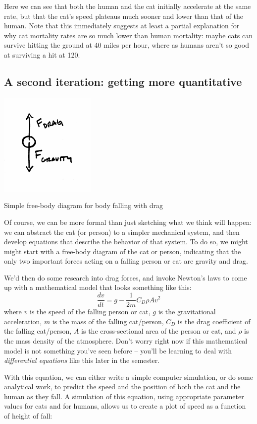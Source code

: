 Here we can see that both the human and the cat initially accelerate at the same rate, but that the cat's speed plateaus much sooner and lower than that of the human.  Note that this immediately suggests at least a partial explanation for why cat mortality rates are so much lower than human mortality:  maybe cats can survive hitting the ground at 40 miles per hour, where as humans aren't so good at surviving a hit at 120.

\subsection{A second iteration: getting more quantitative}
\begin{marginfigure}
\centerline{\includegraphics[height=5cm]{figs/CatFBD}}
\caption{Simple free-body diagram for body falling with drag}
\end{marginfigure}
Of course, we can be more formal than just sketching what we think will happen:  we can abstract the cat (or person) to a simpler mechanical system, and then develop equations that describe the behavior of that system.  To do so, we might might start with a free-body diagram of the cat or person,
indicating that the only two important forces acting on a falling person or cat are gravity and drag.

We'd then do some research into drag forces, and invoke Newton's laws to come up with a mathematical model that looks something like this:
$$ \frac{dv}{dt} = g - \frac{1}{2m} C_D \rho A v^2$$
where $v$ is the speed of the falling person or cat, $g$ is the gravitational acceleration, $m$ is the mass of the falling cat/person, $C_D$ is the drag coefficient of the falling cat/person, $A$ is the cross-sectional area of the person or cat, and $\rho$ is the mass density of the atmosphere.  Don't worry right now if this mathematical model is not something you've seen before -- you'll be learning to deal with {\it differential equations} like this later in the semester.  

With this equation, we can either write a simple computer simulation, or do some analytical work, to predict the speed and the position of both the cat and the human as they fall.  A simulation of this equation, using appropriate parameter values for cats and for humans, allows us to create a plot of speed as a function of height of fall:

